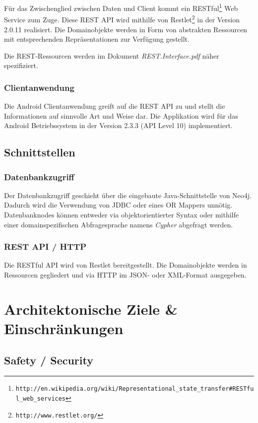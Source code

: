 \documentclass[10pt,a4paper]{scrartcl}
\begin{document}
Für das Zwischenglied zwischen Daten und Client kommt ein
RESTful\footnote{\texttt{http://en.wikipedia.org/wiki/Representational\_state\_transfer\#RESTful\_web\_services}}
Web Service zum Zuge. Diese REST API wird mithilfe von
Restlet\footnote{\texttt{http://www.restlet.org/}} in der Version 2.0.11 realisiert. Die Domainobjekte werden in Form von
abstrakten Ressourcen mit entsprechenden Repräsentationen zur Verfügung gestellt.

Die REST-Ressourcen werden im Dokument \textit{REST.Interface.pdf} näher spezifiziert.

\subsubsection{Clientanwendung}

Die Android Clientanwendung greift auf die REST API zu und stellt die Informationen auf sinnvolle
Art und Weise dar. Die Applikation wird für das Android Betriebssystem in der Version 2.3.3 (API Level 10) implementiert.


\subsection{Schnittstellen}

\subsubsection{Datenbankzugriff}

Der Datenbankzugriff geschieht über die eingebaute Java-Schnittstelle von Neo4j. Dadurch wird die
Verwendung von JDBC oder eines OR Mappers unnötig. Datenbanknodes können entweder via
objektorientierter Syntax oder mithilfe einer domainspezifischen Abfragesprache namens
\textit{Cypher} abgefragt werden.

\subsubsection{REST API / HTTP}

Die RESTful API wird von Restlet bereitgestellt. Die Domainobjekte werden in Ressourcen gegliedert
und via HTTP im JSON- oder XML-Format ausgegeben.


\section{Architektonische Ziele \& Einschränkungen}

\subsection{Safety / Security}
\end{document}
